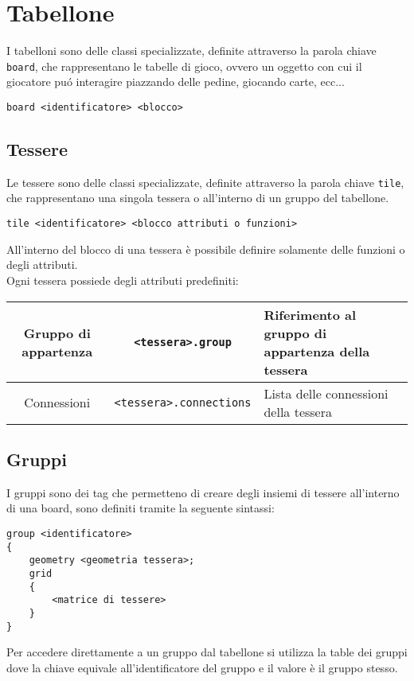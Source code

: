 \section{Tabellone}
I tabelloni sono delle classi specializzate, definite attraverso la parola chiave \lstinline|board|,
che rappresentano le tabelle di gioco, ovvero un oggetto con cui
il giocatore puó interagire piazzando delle pedine, giocando carte, ecc... \\ 
\begin{lstlisting}
board <identificatore> <blocco>
\end{lstlisting}

\subsection{Tessere}
Le tessere sono delle classi specializzate, definite attraverso la parola chiave \lstinline|tile|,
che rappresentano una singola tessera o all'interno di un gruppo del tabellone. \\
\begin{lstlisting}
tile <identificatore> <blocco attributi o funzioni>
\end{lstlisting}
All'interno del blocco di una tessera è possibile definire solamente delle funzioni o degli attributi. \\ 
Ogni tessera possiede degli attributi predefiniti:
\begin{center}
\begin{tabular}{|c|c|p{5cm}|}
    \hline 
    Gruppo di appartenza & \lstinline|<tessera>.group| & Riferimento al gruppo di appartenza della tessera \\ 
    \hline
    Connessioni & \lstinline|<tessera>.connections| & Lista delle connessioni della tessera \\
    \hline 
\end{tabular}
\end{center}

\subsection{Gruppi}
I gruppi sono dei tag che permetteno di creare degli insiemi di tessere all'interno di una board,
sono definiti tramite la seguente sintassi:
\begin{lstlisting}
group <identificatore> 
{
    geometry <geometria tessera>;
    grid 
    {
        <matrice di tessere>
    }
}
\end{lstlisting}
Per accedere direttamente a un gruppo dal tabellone si utilizza la table dei gruppi
dove la chiave equivale all'identificatore del gruppo e il valore è il gruppo stesso.

